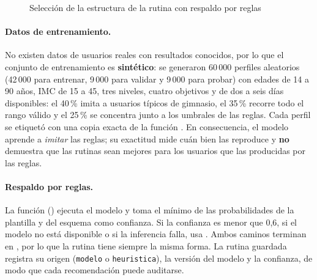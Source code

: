 \begin{figure}[H]
\centering
{}
\caption{Selección de la estructura de la rutina con respaldo por reglas}
\label{fig:flujo-planificador}
\end{figure}

\paragraph{Datos de entrenamiento.} No existen datos de usuarios reales con
resultados conocidos, por lo que el conjunto de entrenamiento es
\textbf{sintético}: se generaron 60\,000 perfiles aleatorios (42\,000 para
entrenar, 9\,000 para validar y 9\,000 para probar) con edades de 14 a 90 años,
IMC de 15 a 45, tres niveles, cuatro objetivos y de dos a seis días
disponibles: el 40\,\% imita a usuarios típicos de gimnasio, el 35\,\% recorre
todo el rango válido y el 25\,\% se concentra junto a los umbrales de las
reglas. Cada perfil se etiquetó con una copia exacta de la función
. En consecuencia, el modelo aprende a \emph{imitar} las
reglas; su exactitud mide cuán bien las reproduce y \textbf{no} demuestra que
las rutinas sean mejores para los usuarios que las producidas por las reglas.

\paragraph{Respaldo por reglas.} La función 
() ejecuta el modelo y toma el mínimo
de las probabilidades de la plantilla y del esquema como confianza. Si la
confianza es menor que 0,6, si el modelo no está disponible o si la
inferencia falla, usa . Ambos caminos terminan en
, por lo que la rutina tiene siempre la misma forma. La
rutina guardada registra su origen (\texttt{modelo} o \texttt{heuristica}), la
versión del modelo y la confianza, de modo que cada recomendación puede
auditarse.

